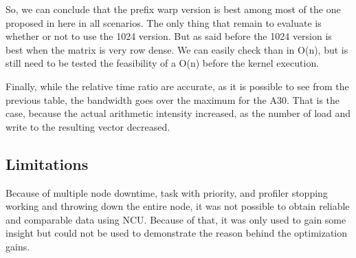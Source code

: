 \documentclass[conference]{IEEEtran}
\begin{document}
So, we can conclude that the prefix warp version is best among most of the one proposed in here in all scenarios. The only thing that remain to evaluate is whether or not to use the 1024 version. But as said before the 1024 version is best when the matrix is very row dense. We can easily check than in O(n), but is still need to be tested the feasibility of a O(n) before the kernel execution.

Finally, while the relative time ratio are accurate, as it is possible to see from the previous table, the bandwidth goes over the maximum for the A30. That is the case, because the actual arithmetic intensity increased, as the number of load and write to the resulting vector decreased.

\subsection{Limitations}
Because of multiple node downtime, task with priority, and profiler stopping working and throwing down the entire node, it was not possible to obtain reliable and comparable data using NCU. Because of that, it was only used to gain some insight but could not be used to demonstrate the reason behind the optimization gains.
\end{document}
